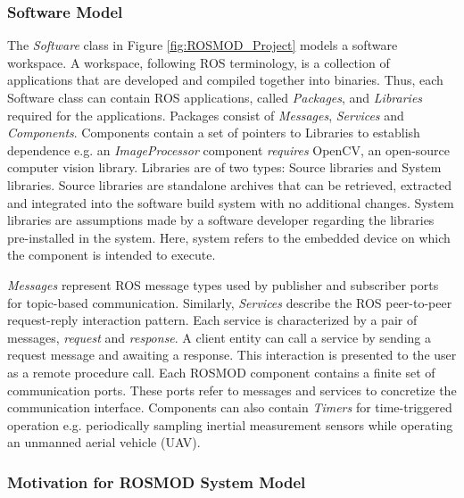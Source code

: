 \subsubsection{Software Model}

The \emph{Software} class in Figure \ref{fig:ROSMOD_Project} models a software workspace. A workspace, following ROS terminology, is a collection of applications that are developed and compiled together into binaries. Thus, each Software class can contain ROS applications, called \emph{Packages}, and \emph{Libraries} required for the applications. Packages consist of \emph{Messages}, \emph{Services} and \emph{Components}. Components contain a set of pointers to Libraries to establish dependence e.g. an \emph{ImageProcessor} component \emph{requires} OpenCV, an open-source computer vision library. Libraries are of two types: Source libraries and System libraries. Source libraries are standalone archives that can be retrieved, extracted and integrated into the software build system with no additional changes. System libraries are assumptions made by a software developer regarding the libraries pre-installed in the system. Here, system refers to the embedded device on which the component is intended to execute.

\emph{Messages} represent ROS message types used by publisher and subscriber ports for topic-based communication. Similarly, \emph{Services} describe the ROS peer-to-peer request-reply interaction pattern. Each service is characterized by a pair of messages, \emph{request} and \emph{response}. A client entity can call a service by sending a request message and awaiting a response. This interaction is presented to the user as a remote procedure call. Each ROSMOD component contains a finite set of communication ports. These ports refer to messages and services to concretize the communication interface. Components can also contain \emph{Timers} for time-triggered operation e.g. periodically sampling inertial measurement sensors while operating an unmanned aerial vehicle
(UAV).

\subsubsection{Motivation for ROSMOD System Model}

